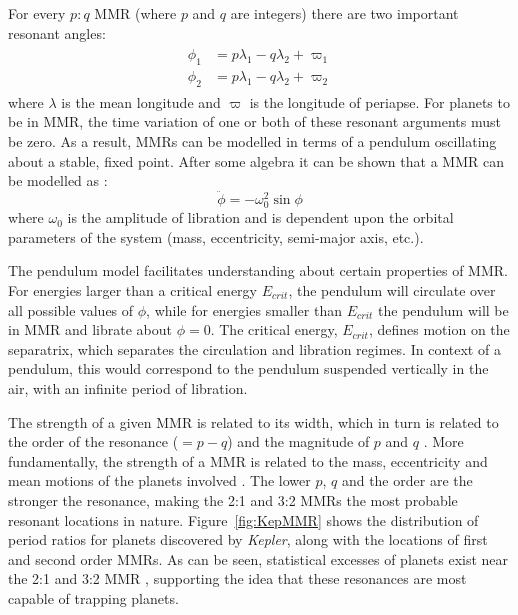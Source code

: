 \documentclass[12pt,letter]{aastex}
\newcommand{\kep}{{\it Kepler}\xspace}
\begin{document}
For every $p:q$ MMR (where $p$ and $q$ are integers) there are two important resonant angles:
\begin{align}
\begin{split}
\phi_1 &= p\lambda_1 - q\lambda_2 + \varpi_1 \\
\phi_2 &= p\lambda_1 - q\lambda_2 + \varpi_2 
\label{eq:MMR}
\end{split}
\end{align}
where $\lambda$ is the mean longitude and $\varpi$ is the longitude of periapse. 
For planets to be in MMR, the time variation of one or both of these resonant arguments must be zero.
As a result, MMRs can be modelled in terms of a pendulum oscillating about a stable, fixed point. 
After some algebra it can be shown that a MMR can be modelled as \citep{SSD1999}:
\begin{equation}
\ddot{\phi} = -\omega_0^2 \sin\phi
\label{eq:pendulum}
\end{equation}
where $\omega_0$ is the amplitude of libration and is dependent upon the orbital parameters of the system (mass, eccentricity, semi-major axis, etc.).

The pendulum model facilitates understanding about certain properties of MMR. 
For energies larger than a critical energy $E_{crit}$, the pendulum will circulate over all possible values of $\phi$, while for energies smaller than $E_{crit}$ the pendulum will be in MMR and librate about $\phi = 0$.
The critical energy, $E_{crit}$, defines motion on the separatrix, which separates the circulation and libration regimes. 
In context of a pendulum, this would correspond to the pendulum suspended vertically in the air, with an infinite period of libration. 

The strength of a given MMR is related to its width, which in turn is related to the order of the resonance ($= p - q$) and the magnitude of $p$ and $q$ \citep{SSD1999}. 
More fundamentally, the strength of a MMR is related to the mass, eccentricity and mean motions of the planets involved \citep{SSD1999}.
The lower $p$, $q$ and the order are the stronger the resonance, making the 2:1 and 3:2 MMRs the most probable resonant locations in nature. 
Figure~\ref{fig:KepMMR} shows the distribution of period ratios for planets discovered by \kep, along with the locations of first and second order MMRs. 
As can be seen, statistical excesses of planets exist near the 2:1 and 3:2 MMR \citep{Lissauer2011,Fabrycky2014,Steffen2015}, supporting the idea that these resonances are most capable of trapping planets.
\end{document}
